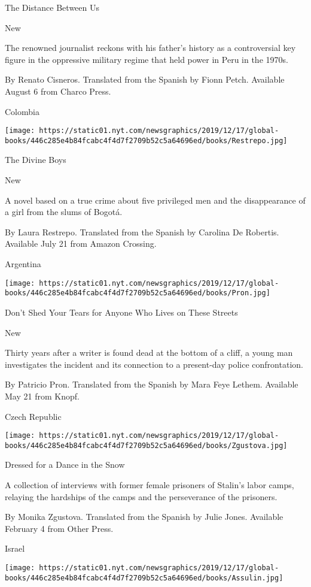 The Distance Between Us

New

The renowned journalist reckons with his father's history as a
controversial key figure in the oppressive military regime that held
power in Peru in the 1970s.

 By Renato Cisneros. Translated from the Spanish by Fionn Petch.
Available August 6 from Charco Press.

Colombia

\texttt{[image: https://static01.nyt.com/newsgraphics/2019/12/17/global-books/446c285e4b84fcabc4f4d7f2709b52c5a64696ed/books/Restrepo.jpg]}

The Divine Boys

New

A novel based on a true crime about five privileged men and the
disappearance of a girl from the slums of Bogotá.

 By Laura Restrepo. Translated from the Spanish by Carolina De Robertis.
Available July 21 from Amazon Crossing.

Argentina

\texttt{[image: https://static01.nyt.com/newsgraphics/2019/12/17/global-books/446c285e4b84fcabc4f4d7f2709b52c5a64696ed/books/Pron.jpg]}

Don't Shed Your Tears for Anyone Who Lives on These Streets

New

Thirty years after a writer is found dead at the bottom of a cliff, a
young man investigates the incident and its connection to a present-day
police confrontation.

 By Patricio Pron. Translated from the Spanish by Mara Feye Lethem.
Available May 21 from Knopf.

Czech Republic

\texttt{[image: https://static01.nyt.com/newsgraphics/2019/12/17/global-books/446c285e4b84fcabc4f4d7f2709b52c5a64696ed/books/Zgustova.jpg]}

Dressed for a Dance in the Snow

A collection of interviews with former female prisoners of Stalin's
labor camps, relaying the hardships of the camps and the perseverance of
the prisoners.

 By Monika Zgustova. Translated from the Spanish by Julie Jones.
Available February 4 from Other Press.

Israel

\texttt{[image: https://static01.nyt.com/newsgraphics/2019/12/17/global-books/446c285e4b84fcabc4f4d7f2709b52c5a64696ed/books/Assulin.jpg]}

